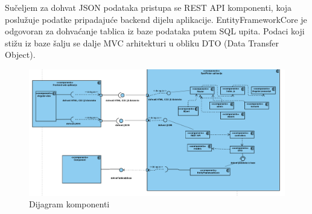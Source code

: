 			 {Sučeljem za dohvat JSON podataka pristupa se REST API komponenti, koja poslužuje podatke pripadajuće backend dijelu aplikacije. EntityFrameworkCore je odgovoran za dohvaćanje tablica iz baze podataka putem SQL upita. Podaci koji stižu iz baze šalju se dalje MVC arhitekturi u obliku DTO (Data Transfer Object).}
			 
			
			 
			 \begin{figure}[h]
			 	\centering
			 	\includegraphics[width=\textwidth,keepaspectratio]{slike/DijagramKomponenti.png}
			 	\caption{Dijagram komponenti}
			 	\label{fig:DijagramKomponenti}
			 \end{figure}
			 